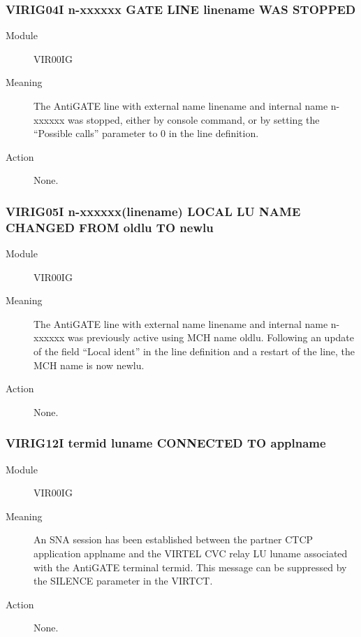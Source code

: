 \documentclass[letterpaper,10pt,english]{sphinxmanual}
\begin{document}
\subsubsection{VIRIG04I n-xxxxxx GATE LINE linename WAS STOPPED}
\label{\detokenize{messages:virig04i-n-xxxxxx-gate-line-linename-was-stopped}}\begin{description}
\item[{Module}] \leavevmode
VIR00IG

\item[{Meaning}] \leavevmode
The AntiGATE line with external name linename and internal name n-xxxxxx was stopped, either by console command, or by setting the “Possible calls” parameter to 0 in the line definition.

\item[{Action}] \leavevmode
None.

\end{description}


\subsubsection{VIRIG05I n-xxxxxx(linename) LOCAL LU NAME CHANGED FROM oldlu TO newlu}
\label{\detokenize{messages:virig05i-n-xxxxxx-linename-local-lu-name-changed-from-oldlu-to-newlu}}\begin{description}
\item[{Module}] \leavevmode
VIR00IG

\item[{Meaning}] \leavevmode
The AntiGATE line with external name linename and internal name n-xxxxxx was previously active using MCH name oldlu. Following an update of the field “Local ident” in the line definition and a restart of the line, the MCH name is now newlu.

\item[{Action}] \leavevmode
None.

\end{description}


\subsubsection{VIRIG12I termid luname CONNECTED TO applname}
\label{\detokenize{messages:virig12i-termid-luname-connected-to-applname}}\begin{description}
\item[{Module}] \leavevmode
VIR00IG

\item[{Meaning}] \leavevmode
An SNA session has been established between the partner CTCP application applname and the VIRTEL CVC relay LU luname associated with the AntiGATE terminal termid. This message can be suppressed by the SILENCE parameter in the VIRTCT.

\item[{Action}] \leavevmode
None.

\end{description}
\end{document}
